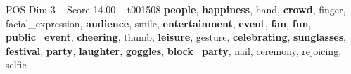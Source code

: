 \begin{textsample}{POS Dim 3 – Score 14.00 – t001508}  \label{ex:f3_pos_034}
\textbf{people}, \textbf{happiness}, hand, \textbf{crowd}, finger, facial\_expression, \textbf{audience}, smile, \textbf{entertainment}, \textbf{event}, \textbf{fan}, \textbf{fun}, \textbf{public\_event}, \textbf{cheering}, thumb, \textbf{leisure}, gesture, \textbf{celebrating}, \textbf{sunglasses}, \textbf{festival}, \textbf{party}, \textbf{laughter}, \textbf{goggles}, \textbf{block\_party}, nail, ceremony, rejoicing, selfie

\end{textsample}
